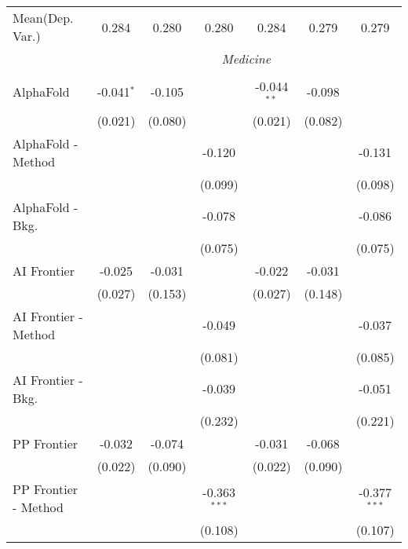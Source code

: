 \begin{tabular}{lcccccc}
Mean(Dep. Var.) & 0.284 & 0.280 & 0.280 & 0.284 & 0.279 & 0.279 \\
 & \multicolumn{6}{c}{\textit{Medicine}} \\ \\
   AlphaFold            & -0.041$^{*}$ & -0.105  &                & -0.044$^{**}$ & -0.098         &   \\   
                        & (0.021)      & (0.080) &                & (0.021)       & (0.082)        &   \\   
   AlphaFold - Method   &              &         & -0.120         &               &                & -0.131\\   
                        &              &         & (0.099)        &               &                & (0.098)\\   
   AlphaFold - Bkg.     &              &         & -0.078         &               &                & -0.086\\   
                        &              &         & (0.075)        &               &                & (0.075)\\   
   AI Frontier          & -0.025       & -0.031  &                & -0.022        & -0.031         &   \\   
                        & (0.027)      & (0.153) &                & (0.027)       & (0.148)        &   \\   
   AI Frontier - Method &              &         & -0.049         &               &                & -0.037\\   
                        &              &         & (0.081)        &               &                & (0.085)\\   
   AI Frontier - Bkg.   &              &         & -0.039         &               &                & -0.051\\   
                        &              &         & (0.232)        &               &                & (0.221)\\   
   PP Frontier          & -0.032       & -0.074  &                & -0.031        & -0.068         &   \\   
                        & (0.022)      & (0.090) &                & (0.022)       & (0.090)        &   \\   
   PP Frontier - Method &              &         & -0.363$^{***}$ &               &                & -0.377$^{***}$\\   
                        &              &         & (0.108)        &               &                & (0.107)\\   

\end{tabular}
